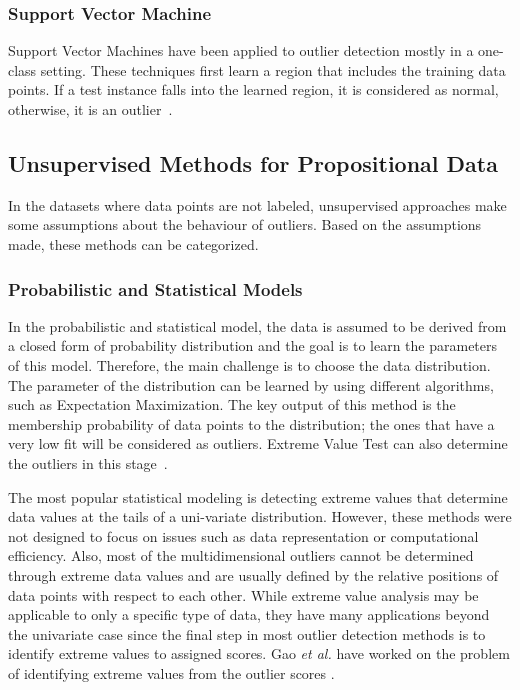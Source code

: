 \subsubsection{Support Vector Machine}
Support Vector Machines have been applied to outlier detection mostly in a one-class setting. These techniques first learn a region that includes the training data points. If a test instance falls into the learned region, it is considered as normal, otherwise, it is an outlier~\cite{DavyG02,RatMikSchMul02}.
\subsection{Unsupervised Methods for Propositional Data}
In the datasets where data points are not labeled, unsupervised approaches make some assumptions about the behaviour of outliers. Based on the assumptions made, these methods can be categorized.
\subsubsection{Probabilistic and Statistical Models}
In the probabilistic and statistical model, the data is assumed to be derived from a closed form of probability distribution and the goal is to learn the parameters of this model. Therefore, the main challenge is to choose the data distribution. The parameter of the distribution can be learned by using different algorithms, such as Expectation Maximization. The key output of this method is the membership probability of data points to the distribution; the ones that have a very low fit will be considered as outliers. Extreme Value Test can also determine the outliers in this stage~\cite{aggarwal2013}. 

The most popular statistical modeling is detecting extreme values that determine data values at the tails of a uni-variate distribution. However, these methods were not designed to focus on issues such as data representation or computational efficiency. 
Also, most of the multidimensional outliers cannot be determined through extreme data values and are usually defined by the relative positions of data points with respect to each other. While extreme value analysis may be applicable to only a specific type of data, they have many applications beyond the univariate case since the final step in most outlier detection methods is to identify extreme values to assigned scores. Gao {\em et al.}  have worked on the problem of identifying extreme values from the outlier scores \cite{GaoT06}. 

